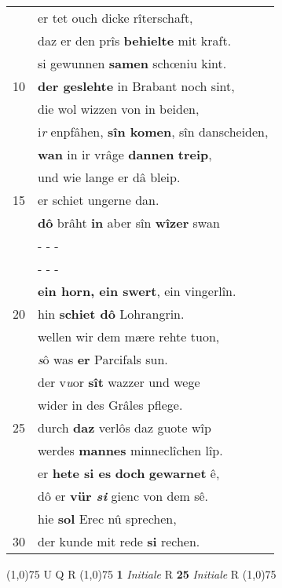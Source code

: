 \documentclass[8pt,a4paper,notitlepage]{article}
\begin{document}
\begin{table}[ht]
\begin{minipage}[t]{0.5\linewidth}
\begin{tabular}{rl}
 & er tet ouch dicke rîterschaft,\\ 
 & daz er den prîs \textbf{behielte} mit kraft.\\ 
 & si gewunnen \textbf{samen} schœniu kint.\\ 
10 & \textbf{der geslehte} in Brabant noch sint,\\ 
 & die wol wizzen von in beiden,\\ 
 & i\textit{r} enpfâhen, \textbf{sîn komen}, sîn danscheiden,\\ 
 & \textbf{wan} in ir vrâge \textbf{dannen} \textbf{treip},\\ 
 & und wie lange er dâ bleip.\\ 
15 & er schiet ungerne dan.\\ 
 & \textbf{dô} brâht \textbf{in} aber sîn \textbf{wîzer} swan\\ 
 & \multicolumn{1}{l}{ - - - }\\ 
 & \multicolumn{1}{l}{ - - - }\\ 
 & \textbf{ein horn, ein swert}, ein vingerlîn.\\ 
20 & hin \textbf{schiet dô} Lohrangrin.\\ 
 & wellen wir dem mære rehte tuon,\\ 
 & \textit{s}ô was \textbf{er} Parcifals sun.\\ 
 & der v\textit{u}or \textbf{sît} wazzer und wege\\ 
 & wider in des Grâles pflege.\\ 
25 & durch \textbf{daz} verlôs daz guote wîp\\ 
 & werdes \textbf{mannes} minneclîchen lîp.\\ 
 & er \textbf{hete si es} \textbf{doch} \textbf{gewarnet} ê,\\ 
 & dô er \textbf{vür \textit{si}} gienc von dem sê.\\ 
 & hie \textbf{sol} Erec nû sprechen,\\ 
30 & der kunde mit rede \textbf{si} rechen.\\ 
\end{tabular}
\scriptsize
\line(1,0){75} \newline
U Q R \newline
\line(1,0){75} \newline
\textbf{1} \textit{Initiale} R  \textbf{25} \textit{Initiale} R  \newline
\line(1,0){75} \newline

\end{minipage}
\end{table}
\end{document}
